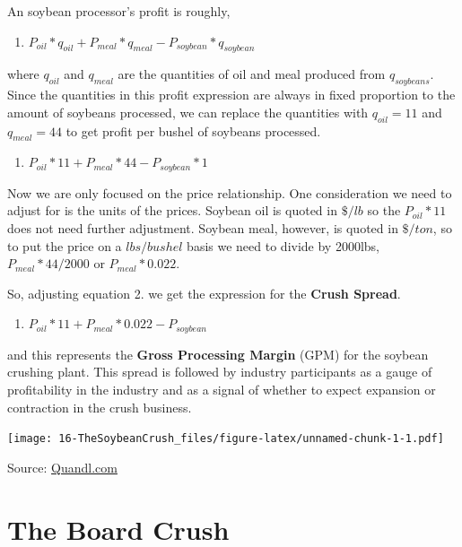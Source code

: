 \documentclass[
]{book}
\providecommand{\tightlist}{%
  \setlength{\itemsep}{0pt}\setlength{\parskip}{0pt}}
\begin{document}
An soybean processor's profit is roughly,

\begin{enumerate}
\def\labelenumi{\arabic{enumi}.}
\tightlist
\item
  \(P_{oil}*q_{oil} + P_{meal}*q_{meal} - P_{soybean}*q_{soybean}\)
\end{enumerate}

where \(q_{oil}\) and \(q_{meal}\) are the quantities of oil and meal produced from \(q_{soybeans}\). Since the quantities in this profit expression are always in fixed proportion to the amount of soybeans processed, we can replace the quantities with \(q_{oil} = 11\) and \(q_{meal} = 44\) to get profit per bushel of soybeans processed.

\begin{enumerate}
\def\labelenumi{\arabic{enumi}.}
\setcounter{enumi}{1}
\tightlist
\item
  \(P_{oil}*11 + P_{meal}*44 - P_{soybean}*1\)
\end{enumerate}

Now we are only focused on the price relationship. One consideration we need to adjust for is the units of the prices. Soybean oil is quoted in \(\$/lb\) so the \(P_{oil}*11\) does not need further adjustment. Soybean meal, however, is quoted in \(\$/ton\), so to put the price on a \(lbs/bushel\) basis we need to divide by 2000lbs, \(P_{meal}*44/2000\) or \(P_{meal}*0.022\).

So, adjusting equation 2. we get the expression for the \textbf{Crush Spread}.

\begin{enumerate}
\def\labelenumi{\arabic{enumi}.}
\setcounter{enumi}{2}
\tightlist
\item
  \(P_{oil}*11 + P_{meal}*0.022 - P_{soybean}\)
\end{enumerate}

and this represents the \textbf{Gross Processing Margin} (GPM) for the soybean crushing plant. This spread is followed by industry participants as a gauge of profitability in the industry and as a signal of whether to expect expansion or contraction in the crush business.

\texttt{[image: 16-TheSoybeanCrush\_files/figure-latex/unnamed-chunk-1-1.pdf]}

Source: \href{www.Quandl.com}{Quandl.com}

\hypertarget{the-board-crush}{%
\section{The Board Crush}\label{the-board-crush}}
\end{document}
